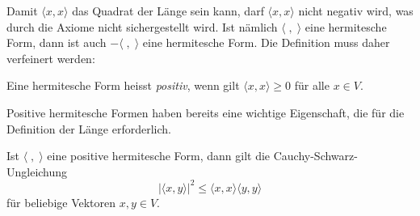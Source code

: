 Damit $\langle x,x\rangle$ das Quadrat der Länge sein kann, darf
$\langle x,x\rangle$ nicht negativ wird, was
durch die Axiome nicht sichergestellt wird.
Ist nämlich $\langle\;,\;\rangle$ eine hermitesche Form, dann ist
auch $-\langle\;,\;\rangle$ eine hermitesche Form.
Die Definition muss daher verfeinert werden:

\begin{definition}
\label{hilbert:postiveform}
Eine hermitesche Form heisst {\em positiv}, wenn gilt
$\langle x,x\rangle \ge 0$ für alle $x\in V$.
\end{definition}

Positive hermitesche Formen haben bereits eine wichtige Eigenschaft,
die für die Definition der Länge erforderlich.

\begin{satz} Ist $\langle\;,\;\rangle$ eine positive hermitesche
Form, dann gilt die Cauchy-Schwarz-Ungleichung
\[
|\langle x,y\rangle|^2 \le \langle x,x\rangle\langle y,y\rangle
\]
für beliebige Vektoren $x,y\in V$.
\end{satz}

